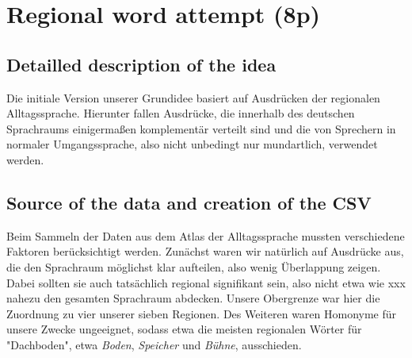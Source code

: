 \documentclass[../Main.tex]{subfiles}
\begin{document}
\section{Regional word attempt (8p)}
\subsection{Detailled description of the idea}
Die initiale Version unserer Grundidee basiert auf Ausdrücken der regionalen Alltagssprache. Hierunter fallen Ausdrücke, die innerhalb des deutschen Sprachraums einigermaßen komplementär verteilt sind und die von Sprechern in normaler Umgangssprache, also nicht unbedingt nur mundartlich, verwendet werden.

\subsection{Source of the data and creation of the CSV}
Beim Sammeln der Daten aus dem Atlas der Alltagssprache mussten verschiedene Faktoren berücksichtigt werden. Zunächst waren wir natürlich auf Ausdrücke aus, die den Sprachraum möglichst klar aufteilen, also wenig Überlappung zeigen. Dabei sollten sie auch tatsächlich regional signifikant sein, also nicht etwa wie xxx nahezu den gesamten Sprachraum abdecken. Unsere Obergrenze war hier die Zuordnung zu vier unserer sieben Regionen. Des Weiteren waren Homonyme für unsere Zwecke ungeeignet, sodass etwa die meisten regionalen Wörter für "Dachboden", etwa \textit{Boden}, \textit{Speicher} und \textit{Bühne}, ausschieden.
\end{document}
